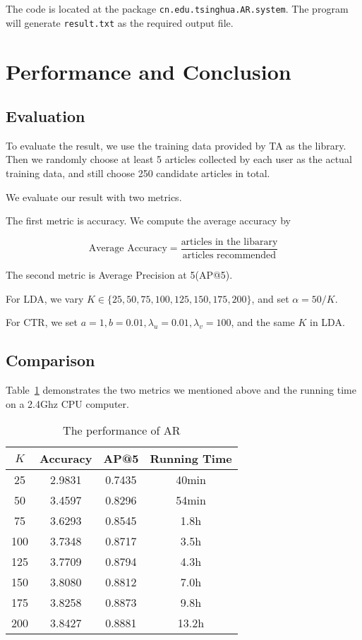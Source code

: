 \documentclass{acm_proc_article-sp}
\begin{document}
The code is located at the package \texttt{cn.edu.tsinghua.AR.system}. The program will generate \texttt{result.txt} as the required output file.


\section{Performance and Conclusion}
\label{performance}
\subsection{Evaluation}
To evaluate the result, we use the training data provided by TA as the library. Then we randomly choose at least 5 articles collected by each user as the actual training data, and still choose 250 candidate articles in total.

We evaluate our result with two metrics.

The first metric is accuracy. We compute the average accuracy by

\begin{equation}
\text{Average Accuracy}=\frac{\text{articles in the libarary}}{\text{articles recommended}}
\end{equation}

The second metric is Average Precision at 5(AP@5)\cite{Zhu2004}.

For LDA, we vary $K \in \{25, 50, 75, 100, 125, 150, 175, 200\}$, and set $\alpha=50/K$.

For CTR, we set $a=1, b=0.01, \lambda_u=0.01, \lambda_v=100$, and the same $K$ in LDA.

\subsection{Comparison}

Table~\ref{tab:performance} demonstrates the two metrics we mentioned above and the running time on a 2.4Ghz CPU computer.

\begin{table}[htbp]
\centering
\caption{The performance of AR\label{tab:performance}}
\begin{tabular}{cccc} \hline
$K$ & Accuracy & AP@5 & Running Time\\ \hline
25 & 2.9831 & 0.7435 & 40min\\
50 & 3.4597 & 0.8296 & 54min\\
75 & 3.6293 & 0.8545 & 1.8h\\
100 & 3.7348 & 0.8717 & 3.5h\\
125 & 3.7709 & 0.8794 & 4.3h\\
150 & 3.8080 & 0.8812 & 7.0h\\
175 & 3.8258 & 0.8873 & 9.8h\\
200 & 3.8427 & 0.8881 & 13.2h\\
\hline\end{tabular}
\end{table}
\end{document}
